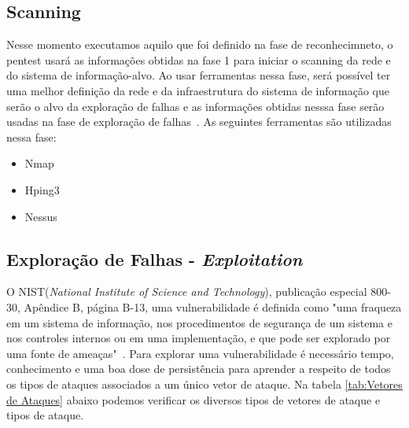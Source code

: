 \subsection{ Scanning}
Nesse momento executamos aquilo que foi definido na fase de reconhecimneto, o pentest usará as informações obtidas na fase 1 para iniciar o scanning da rede e do sistema de informação-alvo. Ao usar ferramentas nessa fase, será possível ter uma melhor definição da rede e da infraestrutura do sistema de informação que serão o alvo da exploração de falhas e as informações obtidas nesssa fase serão usadas na fase de exploração de falhas~\cite{broad}.
As seguintes ferramentas são utilizadas nessa fase:

\begin{itemize}
\item Nmap
\item Hping3
\item Nessus

\end{itemize}

\subsection{Exploração de Falhas - \emph{Exploitation}}

O NIST(\emph{National Institute of Science and Technology}), publicação especial 800-30, Apêndice B, página B-13, uma vulnerabilidade é definida como "uma fraqueza em um sistema de informação, nos procedimentos de segurança de um sistema e nos controles internos ou em uma implementação, e que pode ser explorado por uma fonte de ameaças"~\cite{broad}. Para explorar uma vulnerabilidade é necessário tempo, conhecimento e uma boa dose de persistência para aprender a respeito de todos os tipos de ataques associados a um único vetor de ataque.
Na tabela \ref{tab:Vetores de Ataques} abaixo podemos verificar os diversos tipos de vetores de ataque e tipos de ataque.

